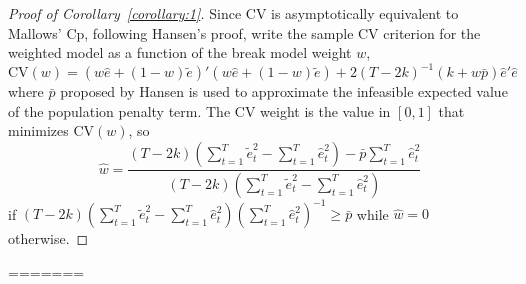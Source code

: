 \begin{proof}[Proof of Corollary~\ref{corollary:1}]
Since CV is asymptotically equivalent to Mallows' Cp, following Hansen's \cite{hansen2009averaging} proof, write the sample CV criterion for the weighted model as a function of the break model weight $w$,
    \begin{equation*}
      \mathrm{CV}(w) = (w\hat{e} + (1-w)\tilde{e})'(w\hat{e} + (1-w)\tilde{e}) + 2(T - 2k)^{-1}(k + w\bar{p})\hat{e}'\hat{e}
    \end{equation*}
where $\bar{p}$ proposed by Hansen is used to approximate the infeasible expected value of the population penalty term. The CV weight is the value in $[0, 1]$ that minimizes $\mathrm{CV}(w)$, so
    \begin{equation*}
      \hat{w} = \frac{(T - 2k)(\sum_{t=1}^{T}\tilde{e}_{t}^{2} - \sum_{t=1}^{T}\hat{e}_{t}^{2}) - \bar{p}\sum_{t=1}^{T}\hat{e}_{t}^{2}}{(T - 2k)(\sum_{t=1}^{T}\tilde{e}_{t}^{2} - \sum_{t=1}^{T}\hat{e}_{t}^{2})}
    \end{equation*}
if $(T - 2k)(\sum_{t=1}^{T}\tilde{e}_{t}^{2} - \sum_{t=1}^{T}\hat{e}_{t}^{2})(\sum_{t=1}^{T}\hat{e}_{t}^{2})^{-1} \geq \bar{p}$ while $\hat{w} = 0$ otherwise.
\end{proof}
=======
